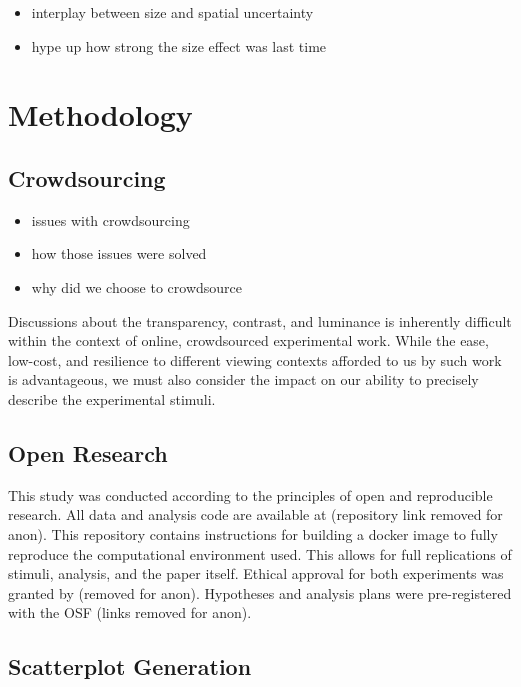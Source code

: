 \documentclass[manuscript, review, anonymous, screen]{acmart}
\providecommand{\tightlist}{%
  \setlength{\itemsep}{0pt}\setlength{\parskip}{0pt}}\usepackage{longtable,booktabs,array}
\begin{document}
\begin{itemize}
\tightlist
\item
  interplay between size and spatial uncertainty
\item
  hype up how strong the size effect was last time
\end{itemize}

\hypertarget{sec-methods}{%
\section{Methodology}\label{sec-methods}}

\hypertarget{crowdsourcing}{%
\subsection{Crowdsourcing}\label{crowdsourcing}}

\begin{itemize}
\tightlist
\item
  issues with crowdsourcing
\item
  how those issues were solved
\item
  why did we choose to crowdsource
\end{itemize}

Discussions about the transparency, contrast, and luminance is
inherently difficult within the context of online, crowdsourced
experimental work. While the ease, low-cost, and resilience to different
viewing contexts afforded to us by such work is advantageous, we must
also consider the impact on our ability to precisely describe the
experimental stimuli.

\hypertarget{sec-open-research}{%
\subsection{Open Research}\label{sec-open-research}}

This study was conducted according to the principles of open and
reproducible research. All data and analysis code are available at
(repository link removed for anon). This repository contains
instructions for building a docker image to fully reproduce the
computational environment used. This allows for full replications of
stimuli, analysis, and the paper itself. Ethical approval for both
experiments was granted by (removed for anon). Hypotheses and analysis
plans were pre-registered with the OSF (links removed for anon).

\hypertarget{sec-scatter-gen}{%
\subsection{Scatterplot Generation}\label{sec-scatter-gen}}
\end{document}
